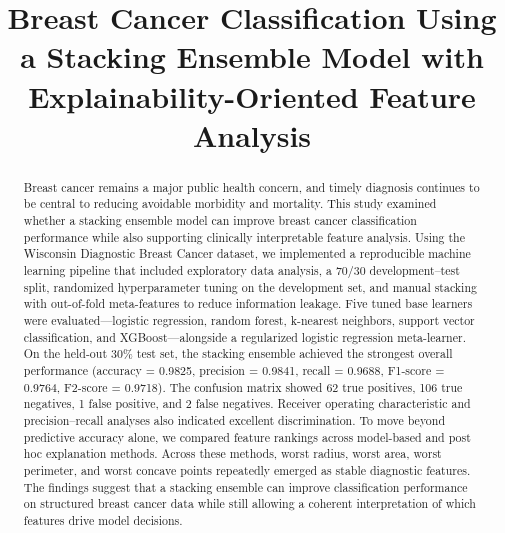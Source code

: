 \documentclass[conference]{IEEEtran}
\begin{document}
\title{Breast Cancer Classification Using a Stacking Ensemble Model with Explainability-Oriented Feature Analysis}

\author{
\and

}

\maketitle

\begin{abstract}
Breast cancer remains a major public health concern, and timely diagnosis continues to be central to reducing avoidable morbidity and mortality. This study examined whether a stacking ensemble model can improve breast cancer classification performance while also supporting clinically interpretable feature analysis. Using the Wisconsin Diagnostic Breast Cancer dataset, we implemented a reproducible machine learning pipeline that included exploratory data analysis, a 70/30 development--test split, randomized hyperparameter tuning on the development set, and manual stacking with out-of-fold meta-features to reduce information leakage. Five tuned base learners were evaluated---logistic regression, random forest, k-nearest neighbors, support vector classification, and XGBoost---alongside a regularized logistic regression meta-learner. On the held-out 30\% test set, the stacking ensemble achieved the strongest overall performance (accuracy = 0.9825, precision = 0.9841, recall = 0.9688, F1-score = 0.9764, F2-score = 0.9718). The confusion matrix showed 62 true positives, 106 true negatives, 1 false positive, and 2 false negatives. Receiver operating characteristic and precision--recall analyses also indicated excellent discrimination. To move beyond predictive accuracy alone, we compared feature rankings across model-based and post hoc explanation methods. Across these methods, worst radius, worst area, worst perimeter, and worst concave points repeatedly emerged as stable diagnostic features. The findings suggest that a stacking ensemble can improve classification performance on structured breast cancer data while still allowing a coherent interpretation of which features drive model decisions.
\end{abstract}
\end{document}
